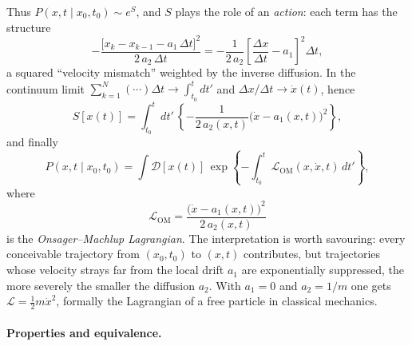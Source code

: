 Thus $P(x,t\mid x_0,t_0)\sim e^{S}$, and $S$ plays the role of an \emph{action}: each term has the structure
\begin{equation}
-\frac{\big[x_k-x_{k-1}-a_1\,\Delta t\big]^2}{2\,a_2\,\Delta t} = -\frac{1}{2\,a_2}\left[\frac{\Delta x}{\Delta t}-a_1\right]^2\Delta t,
\end{equation}
a squared ``velocity mismatch'' weighted by the inverse diffusion.
In the continuum limit $\sum_{k=1}^{N}(\cdots)\Delta t \to \int_{t_0}^{t} dt'$ and $\Delta x/\Delta t \to \dot x(t)$, hence
\begin{equation}
S[x(t)] = \int_{t_0}^{t} dt'\, \left\{-\frac{1}{2\,a_2(x,t)}\big(\dot x - a_1(x,t)\big)^2\right\},
\end{equation}
and finally
\begin{equation}
P(x,t\mid x_0,t_0) = \int \mathcal{D}[x(t)]\, \exp\!\left\{-\int_{t_0}^{t} \mathcal{L}_{\mathrm{OM}}(x,\dot x,t)\,dt'\right\},
\end{equation}
where
\begin{equation}
\mathcal{L}_{\mathrm{OM}} = \frac{\big(\dot x - a_1(x,t)\big)^2}{2\,a_2(x,t)}
\end{equation}
is the \emph{Onsager--Machlup Lagrangian}.\cite{OnsagerMachlup1953}
The interpretation is worth savouring: every conceivable trajectory from $(x_0,t_0)$ to $(x,t)$ contributes, but trajectories whose velocity strays far from the local drift $a_1$ are exponentially suppressed, the more severely the smaller the diffusion $a_2$.
With $a_1=0$ and $a_2=1/m$ one gets $\mathcal{L}=\tfrac{1}{2}m\dot x^2$, formally the Lagrangian of a free particle in classical mechanics.

\paragraph*{Properties and equivalence.}

